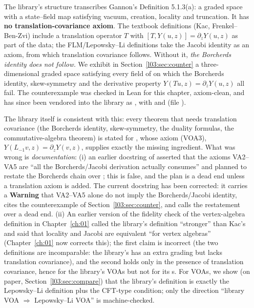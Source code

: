\begin{warning}[title={The main finding of this chapter: Gannon's axioms, \texttt{PreVertexAlgebra}, do not give a vertex algebra in the textbook sense}]
The library's structure  transcribes Gannon's Definition 5.1.3(a): a
graded space with a state--field map satisfying vacuum, creation, locality and truncation. It has
\textbf{no translation-covariance axiom}. The textbook definitions (Kac, Frenkel--Ben-Zvi) include
a translation operator $T$ with $[T,Y(u,z)] = \partial_zY(u,z)$ as part of the data; the
FLM/Lepowsky--Li definitions take the Jacobi identity as an axiom, from which translation
covariance follows. Without it, \emph{the Borcherds identity does not follow.} We exhibit in
Section~\ref{l03:sec:counter} a three-dimensional graded space satisfying every field of
 on which the Borcherds identity, skew-symmetry and the derivative property
$Y(Tu,z) = \partial_zY(u,z)$ all fail. The counterexample was checked in Lean for this chapter, axiom-clean, and has since been
vendored into the library as , with
 and  (file
).

The library itself is consistent with this: every theorem that needs translation covariance
(the Borcherds identity, skew-symmetry, the duality formulas, the commutative-algebra theorem) is
stated for , whose axiom (VOA3), $Y(L_{-1}v,z) = \partial_zY(v,z)$,
supplies exactly the missing ingredient. What was wrong is \emph{documentation}: (i) an earlier
docstring of  asserted that the axioms VA2--VA5 are
``all the Borcherds/Jacobi derivation actually consumes'' and planned to restate the Borcherds chain
over ; this is false, and the plan is a dead end unless a translation axiom is added.
The current docstring has been corrected: it carries a \textbf{Warning} that VA2--VA5 alone do not
imply the Borcherds/Jacobi identity, cites the counterexample of Section~\ref{l03:sec:counter}, and
calls the restatement over  a dead end.
(ii) An earlier version of the fidelity check of the vertex-algebra definition in Chapter~\ref{ch:01}
called the library's definition ``stronger'' than Kac's and said that locality and Jacobi are equivalent
``for vertex algebras'' (Chapter~\ref{ch:01} now corrects this); the first claim is incorrect (the two definitions are incomparable: the
library's has an extra grading but lacks translation covariance), and the second holds only in the
presence of translation covariance, hence for the library's VOAs but not for its
s. For VOAs, we show (on paper, Section~\ref{l03:sec:compare}) that the
library's definition is exactly the Lepowsky--Li definition plus the CFT-type condition; only the direction
``library VOA $\Rightarrow$ Lepowsky--Li VOA'' is machine-checked.


\end{warning}
